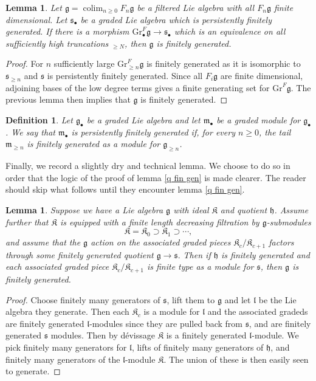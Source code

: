 \documentclass[12pt, oneside]{amsart}       %
\newtheorem{definition}[theorem]{Definition}
\newtheorem{lemma}[theorem]{Lemma}
\theoremstyle{remark}
\renewcommand{\geq}{\geqslant}
\newcommand{\clm}{\operatorname{colim}}
\newcommand{\g}{\mathfrak{g}}
\begin{document}
\begin{lemma} \label{gr pers fin}Let $\g=\clm_{n\geq 0} F_n\g$ be a filtered Lie algebra with all $F_n\g$ finite dimensional. Let $\mathfrak{s}_\bullet$ be a graded Lie algebra which is persistently finitely generated. If there is a morphism $\mathrm{Gr}^F_\bullet\g\to\mathfrak{s}_\bullet$ which is an equivalence on all sufficiently high truncations $_{\geq N}$, then $\g$ is finitely generated.   \end{lemma} \begin{proof} For $n$ sufficiently large $\mathrm{Gr}^F_{\geq n}\g$ is finitely generated as it is isomorphic to $\mathfrak{s}_{\geq n}$ and $\mathfrak{s}$ is persistently finitely generated. Since all $F_i\g$ are finite dimensional, adjoining bases of the low degree terms gives a finite generating set for $\mathrm{Gr}^F\g$. The previous lemma then implies that $\g$ is finitely generated.\end{proof}

\begin{definition} Let $\g_\bullet$ be a graded Lie algebra and let $\mathfrak{m}_\bullet$ be a graded module for $\g_\bullet$. We say that $\mathfrak{m}_\bullet$ is \emph{persistently finitely generated} if, for every $n\geq0$, the tail $\mathfrak{m}_{\geq n}$ is finitely generated as a module for $\g_{\geq n}$.
\end{definition}

Finally, we record a slightly dry and technical lemma. We choose to do so in order that the logic of the proof of lemma \ref{q fin gen} is made clearer. The reader should skip what follows until they encounter lemma \ref{q fin gen}. 

\begin{lemma}\label{tech} Suppose we have a Lie algebra $\g$ with ideal $\mathfrak{K}$ and quotient $\mathfrak{h}$. Assume further that $\mathfrak{K}$ is equipped with a finite length decreasing filtration by $\g$-submodules $$\mathfrak{K}=\mathfrak{K}_0\supset \mathfrak{K}_1\supset\cdots,$$ and assume that the $\g$ action on the associated graded pieces $\mathfrak{K}_c/\mathfrak{K}_{c+1}$ factors through some finitely generated quotient $\g\to\mathfrak{s}.$ Then if $\mathfrak{h}$ is finitely generated and each associated graded piece $\mathfrak{K}_c/\mathfrak{K}_{c+1}$ is finite type as a module for $\mathfrak{s}$, then $\g$ is finitely generated.  \end{lemma} \begin{proof} Choose finitely many generators of $\mathfrak{s}$, lift them to $\g$ and let $\mathfrak{l}$ be the Lie algebra they generate. Then each $\mathfrak{K}_c$ is a module for $\mathfrak{l}$ and the associated gradeds are finitely generated $\mathfrak{l}$-modules since they are pulled back from $\mathfrak{s}$, and are finitely generated $\mathfrak{s}$ modules. Then by d\'{e}vissage $\mathfrak{K}$ is a finitely generated $\mathfrak{l}$-module. We pick finitely many generators for $\mathfrak{l}$, lifts of finitely many generators of $\mathfrak{h}$, and finitely many generators of the $\mathfrak{l}$-module $\mathfrak{K}$. The union of these is then easily seen to generate. \end{proof}
\end{document}
